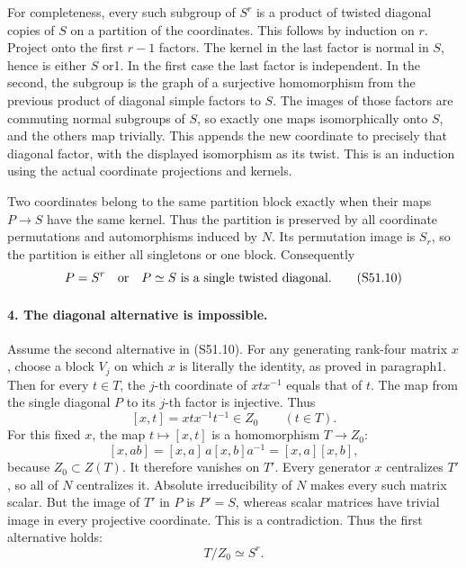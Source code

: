 For completeness, every such subgroup of \(S^r\) is a product
of twisted diagonal copies of \(S\) on a partition of the
coordinates. This follows by induction on \(r\). Project
onto the first \(r-1\) factors. The kernel in the last
factor is normal in \(S\), hence is either \(S\) or1.
In the first case the last factor is independent. In the
second, the subgroup is the graph of a surjective homomorphism
from the previous product of diagonal simple factors to \(S\).
The images of those factors are commuting normal subgroups of
\(S\), so exactly one maps isomorphically onto \(S\), and
the others map trivially. This appends the new coordinate to
precisely that diagonal factor, with the displayed isomorphism
as its twist. This is an induction using the actual coordinate
projections and kernels.

Two coordinates belong to the same partition block exactly
when their maps \(P\to S\) have the same kernel. Thus the
partition is preserved by all coordinate permutations and
automorphisms induced by \(N\). Its permutation image is
\(S_r\), so the partition is either all singletons or one
block. Consequently
\[
             P=S^r\quad\hbox{or}\quad
             P\simeq S\text{ is a single twisted diagonal.}
                                                               \tag{S51.10}
\]

\paragraph{4. The diagonal alternative is impossible.}
Assume the second alternative in (S51.10). For any generating
rank-four matrix \(x\), choose a block \(V_j\) on which
\(x\) is literally the identity, as proved in paragraph1.
Then for every \(t\in T\), the \(j\)-th coordinate of
\(xtx^{-1}\) equals that of \(t\). The map from the
single diagonal \(P\) to its \(j\)-th factor is injective.
Thus
\[
                      [x,t]=xtx^{-1}t^{-1}\in Z_0
                              \qquad(t\in T).             \tag{S51.11}
\]
For this fixed \(x\), the map \(t\mapsto[x,t]\) is a
homomorphism \(T\to Z_0\):
\[
 [x,ab]=[x,a]\,a[x,b]a^{-1}=[x,a][x,b],
                                                               \tag{S51.12}
\]
because \(Z_0\subset Z(T)\). It therefore vanishes on
\(T'\). Every generator \(x\) centralizes \(T'\), so
all of \(N\) centralizes it. Absolute irreducibility of
\(N\) makes every such matrix scalar. But the image of
\(T'\) in \(P\) is \(P'=S\), whereas scalar matrices
have trivial image in every projective coordinate. This is a
contradiction. Thus the first alternative holds:
\[
                              T/Z_0\simeq S^r.             \tag{S51.13}
\]

